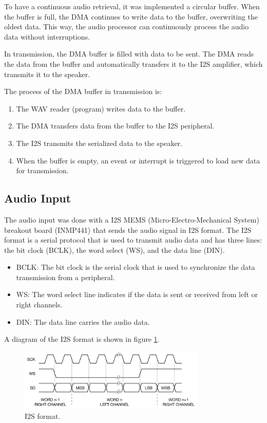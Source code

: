 To have a continuous audio retrieval, it was implemented a circular buffer. When the buffer is full, the DMA continues to write data to the buffer, overwriting the oldest data. This way, the audio processor can continuously process the audio data without interruptions.

In transmission, the DMA buffer is filled with data to be sent. The DMA reads the data from the buffer and automatically transfers it to the I2S amplifier, which transmits it to the speaker.

The process of the DMA buffer in transmission is:
\begin{enumerate}
    \item The WAV reader (program) writes data to the buffer.
    \item The DMA transfers data from the buffer to the I2S peripheral.
    \item The I2S transmits the serialized data to the speaker.
    \item When the buffer is empty, an event or interrupt is triggered to load new data for transmission.
\end{enumerate}

\subsection{Audio Input}

The audio input was done with a I2S MEMS (Micro-Electro-Mechanical System) breakout board (INMP441) that sends the audio signal in I2S format. The I2S format is a serial protocol that is used to transmit audio data and has three lines: the bit clock (BCLK), the word select (WS), and the data line (DIN). 
\begin{itemize}
    \item BCLK: The bit clock is the serial clock that is used to synchronize the data transmission from a peripheral.
    \item WS: The word select line indicates if the data is sent or received from left or right channels.
    \item DIN: The data line carries the audio data.
\end{itemize}

A diagram of the I2S format is shown in figure \ref{fig:I2S}.

\begin{figure}[H]
    \centering
    \includegraphics[width=0.8\textwidth]{Images/i2s.png}
    \caption{I2S format.}
    \label{fig:I2S}
\end{figure}

